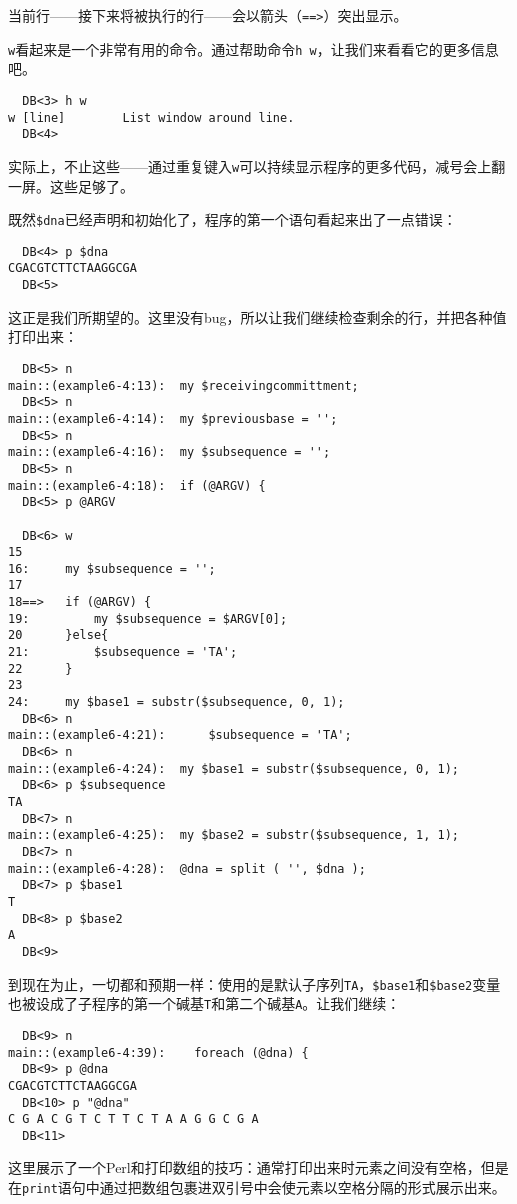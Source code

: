 当前行——接下来将被执行的行——会以箭头（\verb|==>|）突出显示。

\verb|w|看起来是一个非常有用的命令。通过帮助命令\verb|h w|，让我们来看看它的更多信息吧。

\begin{lstlisting}
  DB<3> h w
w [line]        List window around line.
  DB<4> 
\end{lstlisting}

实际上，不止这些——通过重复键入\verb|w|可以持续显示程序的更多代码，减号会上翻一屏。这些足够了。

既然\verb|$dna|已经声明和初始化了，程序的第一个语句看起来出了一点错误：

\begin{lstlisting}
  DB<4> p $dna
CGACGTCTTCTAAGGCGA
  DB<5> 
\end{lstlisting}

这正是我们所期望的。这里没有bug，所以让我们继续检查剩余的行，并把各种值打印出来：

\begin{lstlisting}
  DB<5> n
main::(example6-4:13):	my $receivingcommittment;
  DB<5> n
main::(example6-4:14):	my $previousbase = ''; 
  DB<5> n
main::(example6-4:16):	my $subsequence = '';
  DB<5> n
main::(example6-4:18):	if (@ARGV) {
  DB<5> p @ARGV

  DB<6> w
15
16:     my $subsequence = '';
17
18==>   if (@ARGV) {
19:         my $subsequence = $ARGV[0];
20      }else{
21:         $subsequence = 'TA';
22      }
23
24:     my $base1 = substr($subsequence, 0, 1);
  DB<6> n
main::(example6-4:21):	    $subsequence = 'TA';
  DB<6> n
main::(example6-4:24):	my $base1 = substr($subsequence, 0, 1);
  DB<6> p $subsequence
TA
  DB<7> n
main::(example6-4:25):	my $base2 = substr($subsequence, 1, 1);
  DB<7> n
main::(example6-4:28):	@dna = split ( '', $dna );
  DB<7> p $base1
T
  DB<8> p $base2
A
  DB<9>
\end{lstlisting}

到现在为止，一切都和预期一样：使用的是默认子序列\verb|TA|，\verb|$base1|和\verb|$base2|变量也被设成了子程序的第一个碱基\verb|T|和第二个碱基\verb|A|。让我们继续：

\begin{lstlisting}
  DB<9> n
main::(example6-4:39):    foreach (@dna) {
  DB<9> p @dna
CGACGTCTTCTAAGGCGA
  DB<10> p "@dna"
C G A C G T C T T C T A A G G C G A
  DB<11> 
\end{lstlisting}

这里展示了一个Perl和打印数组的技巧：通常打印出来时元素之间没有空格，但是在\verb|print|语句中通过把数组包裹进双引号中会使元素以空格分隔的形式展示出来。

